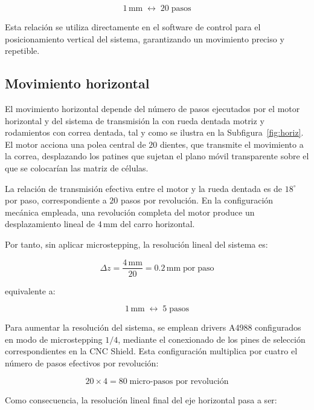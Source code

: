 \begin{equation}
	1\,\mathrm{mm} \;\longleftrightarrow\; 20 \;\text{pasos}
\end{equation}

Esta relación se utiliza directamente en el software de control para el posicionamiento vertical del sistema, garantizando un movimiento preciso y repetible.

\subsection{Movimiento horizontal}

El movimiento horizontal depende del número de pasos ejecutados por el motor horizontal y del sistema de transmisión la con rueda dentada motriz y rodamientos con correa dentada, tal y como se ilustra en la Subfigura~\ref{fig:horiz}. El motor acciona una polea central de $20$ dientes, que transmite el movimiento a la correa, desplazando los patines que sujetan el plano móvil transparente sobre el que se colocarían las matriz de células. 

La relación de transmisión efectiva entre el motor y la rueda dentada es de $18^\circ$ por paso, correspondiente a $20$ pasos por revolución. En la configuración mecánica empleada, una revolución completa del motor produce un desplazamiento lineal de $4\,\mathrm{mm}$ del carro horizontal.

Por tanto, sin aplicar microstepping, la resolución lineal del sistema es:

\begin{equation}
	\Delta z = \frac{4\,\mathrm{mm}}{20} = 0.2\,\mathrm{mm \; por \; paso}
\end{equation}

equivalente a:

\begin{equation}
	1\,\mathrm{mm} \;\longleftrightarrow\; 5 \;\text{pasos}
\end{equation}

Para aumentar la resolución del sistema, se emplean drivers A4988 configurados en modo de microstepping $1/4$, mediante el conexionado de los pines de selección correspondientes en la CNC Shield. Esta configuración multiplica por cuatro el número de pasos efectivos por revolución:

\begin{equation}
	20 \times 4 = 80 \;\text{micro-pasos por revolución}
\end{equation}

Como consecuencia, la resolución lineal final del eje horizontal pasa a ser:

